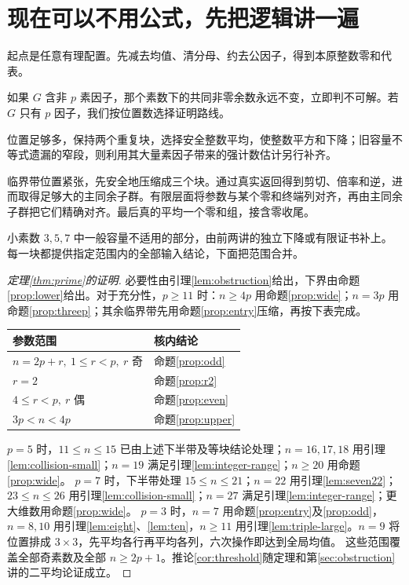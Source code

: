 \documentclass[11pt,a4paper,oneside,openany]{book}
\theoremstyle{definition}
\numberwithin{equation}{chapter}
\begin{document}
\section{现在可以不用公式，先把逻辑讲一遍}
起点是任意有理配置。先减去均值、清分母、约去公因子，得到本原整数零和代表。

如果 $G$ 含非 $p$ 素因子，那个素数下的共同非零余数永远不变，立即判不可解。若 $G$ 只有 $p$ 因子，我们按位置数选择证明路线。

位置足够多，保持两个重复块，选择安全整数平均，使整数平方和下降；旧容量不等式遗漏的窄段，则利用其大量素因子带来的强计数估计另行补齐。

临界带位置紧张，先安全地压缩成三个块。通过真实返回得到剪切、倍率和逆，进而取得足够大的主同余子群。有限层面将参数与某个零和终端列对齐，再由主同余子群把它们精确对齐。最后真的平均一个零和组，接含零收尾。

小素数 $3,5,7$ 中一般容量不适用的部分，由前两讲的独立下降或有限证书补上。每一块都提供指定范围内的全部输入结论，下面把范围合并。
\begin{proof}[定理\ref{thm:prime}的证明]
必要性由引理\ref{lem:obstruction}给出，下界由命题\ref{prop:lower}给出。对于充分性，$p\ge11$ 时：$n\ge4p$ 用命题\ref{prop:wide}；$n=3p$ 用命题\ref{prop:threep}；其余临界带先用命题\ref{prop:entry}压缩，再按下表完成。
\begin{center}
\begin{tabular}{ll}
\toprule 参数范围 & 核内结论\\\midrule
$n=2p+r,\ 1\le r<p,\ r$ 奇 & 命题\ref{prop:odd}\\
$r=2$ & 命题\ref{prop:r2}\\
$4\le r<p,\ r$ 偶 & 命题\ref{prop:even}\\
$3p<n<4p$ & 命题\ref{prop:upper}\\\bottomrule
\end{tabular}
\end{center}
$p=5$ 时，$11\le n\le15$ 已由上述下半带及等块结论处理；$n=16,17,18$ 用引理\ref{lem:collision-small}；$n=19$ 满足引理\ref{lem:integer-range}；$n\ge20$ 用命题\ref{prop:wide}。
$p=7$ 时，下半带处理 $15\le n\le21$；$n=22$ 用引理\ref{lem:seven22}；$23\le n\le26$ 用引理\ref{lem:collision-small}；$n=27$ 满足引理\ref{lem:integer-range}；更大维数用命题\ref{prop:wide}。
$p=3$ 时，$n=7$ 用命题\ref{prop:entry}及\ref{prop:odd}，$n=8,10$ 用引理\ref{lem:eight}、\ref{lem:ten}，$n\ge11$ 用引理\ref{lem:triple-large}。$n=9$ 将位置排成 $3\times3$，先平均各行再平均各列，六次操作即达到全局均值。
这些范围覆盖全部奇素数及全部 $n\ge2p+1$。推论\ref{cor:threshold}随定理和第\ref{sec:obstruction}讲的二平均论证成立。
\end{proof}
\end{document}
